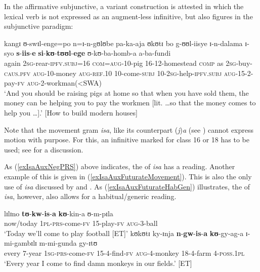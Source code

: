 In the affirmative subjunctive, a variant construction is attested in which the lexical verb is not expressed as an augment-less infinitive, but also figures in the subjunctive paradigm:

\begin{exe}
\ex \gll kangɪ ʊ-swɪl-enge=po n=ɪ-n-gʊlʊbe pa-ka-aja ʊkʊtɪ bo g-ʊʊl-iisye ɪ-n-dalama ɪ-syo \textbf{s}-\textbf{iis}-\textbf{e} \textbf{si}-\textbf{kʊ}-\textbf{tʊʊl}-\textbf{ege} ʊ-kʊ-ba-homb-a a-ba-fundi\\
again \textsc{2sg}-rear-\textsc{ipfv.subj}=16 \textsc{com}=\textsc{aug}-10-pig 16-12-homestead \textsc{comp} as \textsc{2sg}-buy-\textsc{caus.pfv} \textsc{aug}-10-money \textsc{aug}-\textsc{ref.10} 10-come-\textsc{subj} 10-\textsc{2sg}-help-\textsc{ipfv.subj} \textsc{aug}-15-2-pay-\textsc{fv} \textsc{aug}-2-workman(<SWA)\\
\glt \lq And you should be raising pigs at home so that when you have sold them, the money can be helping you to pay the workmen [lit. \ldots so that the money comes to help you \ldots].' [How to build modern houses]
\end{exe}

Note that the movement gram \textit{isa}, like its counterpart (\textit{j})\textit{a} (see ) cannot express motion with purpose. For this, an infinitive marked for  class 16 or 18 has to be used; see  for a discussion.

As (\ref{exIsaAuxNegPRS}) above indicates, the  of \textit{isa} has a  reading. Another example of this is given in (\ref{exIsaAuxFuturateMovement}). This is also the only use of \textit{isa} discussed by \citet{SchumannK1899} and \citet{EndemannC1914}. As (\ref{exIsaAuxFuturateHabGen}) illustrates, the  of \textit{isa}, however, also allows for a habitual/generic reading.

\begin{exe}
\ex \label{exIsaAuxFuturateMovement}
\gll lɪlɪno \textbf{tʊ}-\textbf{kw}-\textbf{is}-\textbf{a} \textbf{kʊ}-kin-a ʊ-m-pɪla\\
now/today \textsc{1pl}-\textsc{prs}-come-\textsc{fv} 15-play-\textsc{fv} \textsc{aug}-3-ball\\
\glt \lq Today we'll come to play football [ET]'
\ex \label{exIsaAuxFuturateHabGen} \gll kʊkʊtɪ ky-ɪnja \textbf{n}-\textbf{gw}-\textbf{is}-\textbf{a} \textbf{kʊ}-gy-ag-a ɪ-mi-gambɪlɪ m-mi-gunda gy-ɪtʊ\\
every 7-year \textsc{1sg}-\textsc{prs}-come-\textsc{fv} 15-4-find-\textsc{fv} \textsc{aug}-4-monkey 18-4-farm 4-\textsc{poss.1pl}\\
\glt \lq Every year I come to find damn monkeys in our fields.' [ET]
\end{exe}%

